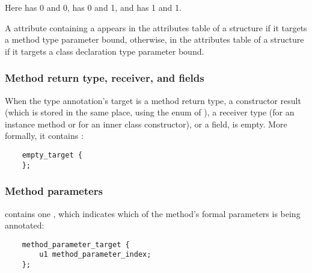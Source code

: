 \documentclass[10pt]{article}
\begin{document}
\noindent
Here
 has  0 and  0,
 has  0 and  1, and
 has  1 and  1.

A \RuntimeInOrVisibleTypeAnnotations attribute containing a
 appears in the attributes table of a
 structure if it targets a method type parameter bound,
otherwise, in the attributes table of a  structure if it
targets a class declaration type parameter bound.


\subsubsection{Method return type, receiver, and fields\label{class-file:ext:ri:return}\label{class-file:ext:ri:receiver}}

When the type annotation's target is a method return type, a constructor
result (which is stored in the same place, using the 
enum of ), a receiver type (for an instance method or for an inner class
constructor), or a field,  is empty.
More formally, it contains :

\preverbnegspace
\begin{Verbatim}
    empty_target {
    };
\end{Verbatim}



\subsubsection{Method parameters\label{class-file:ext:ri:parameters}}

 contains one , which
indicates which of the method's formal parameters is being annotated:

\preverbnegspace
\begin{Verbatim}
    method_parameter_target {
        u1 method_parameter_index;
    };
\end{Verbatim}
\end{document}
